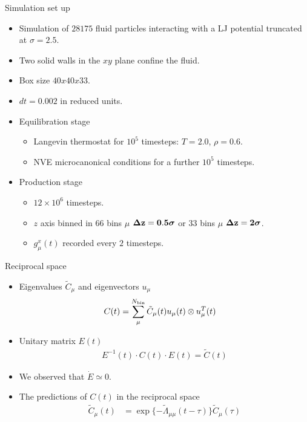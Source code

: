 \documentclass{beamer}
\newcommand{\esc}{\!\cdot\!}
\begin{document}
\begin{frame}{Simulation set up}
   \begin{itemize}
     \item Simulation of $28175$ fluid particles interacting with a LJ potential truncated at $\sigma=2.5$.
     \item Two solid walls in the $xy$ plane confine the fluid.  
     \item Box size $40x40x33$. 
     \item $dt=0.002$ in reduced units.
     \item Equilibration stage
       \begin{itemize}
         \item Langevin thermostat for $10^5$ timesteps: $T=2.0$, $\rho=0.6$.
         \item NVE microcanonical conditions for a further $10^5$ timesteps.
          \end{itemize}
        \item Production stage
       \begin{itemize}
         \item $12\times10^6$ timesteps.
         \item $z$ axis binned in $66$ bins $\mu$ $\boldsymbol{\Delta} {\bf z=0.5}\boldsymbol{\sigma}$ or $33$ bins $\mu$ $\boldsymbol{\Delta} {\bf z=2} \boldsymbol{\sigma}$.
         \item $g_{\mu}^x(t)$ recorded every $2$ timesteps. 
         \end{itemize}
     \end{itemize}
\end{frame}

\begin{frame}{Reciprocal space}
  \begin{itemize}
    \item Eigenvalues $\tilde{C}_{\mu}$ and eigenvectors $u_{\mu}$
\begin{align}
  C(t)&=\sum_\mu^{N_{\rm bin}}\tilde{C}_\mu(t) u_\mu(t) \otimes u_\mu^T(t)
\nonumber
\end{align}
    \item Unitary matrix $E(t)$
\begin{align}
  E^{-1}(t)\esc C(t)\esc E(t)=\tilde{C}(t)
\nonumber
\end{align}
\item We observed that $\dot{E}\simeq 0$.
\item The predictions of $C(t)$ in the reciprocal space
\begin{align}
  \tilde{C}_\mu(t)&=\exp\{-\tilde{\Lambda}_{\mu\mu} (t-\tau)\}  \tilde{C}_\mu(\tau)
  \nonumber
\end{align}
    \end{itemize}
\end{frame}
\end{document}

